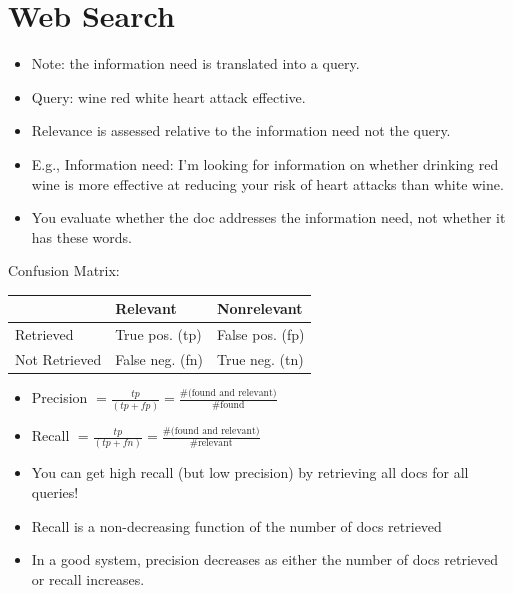 
\section{Web Search}

\begin{breakbox}
\begin{itemize}
	\item Note: the information need is translated into a query.
	\item Query: wine red white heart attack effective.
	\item Relevance is assessed relative to the information need not the query.
	\item E.g., Information need: I'm looking for information on whether drinking red wine is more effective at reducing your risk of heart attacks than white wine.
	\item You evaluate whether the doc addresses the information need, not whether it has these words.
\end{itemize}
\end{breakbox}

\begin{breakbox}
\newline Confusion Matrix:
\begin{center}
\begin{tabular}{| l | l | l |}
\hline
 & Relevant & Nonrelevant \\ \hline
Retrieved	& True pos. (tp) & False pos. (fp) \\ \hline
Not Retrieved & False neg. (fn) & True neg. (tn) \\
\hline
\end{tabular}
\end{center}
\begin{itemize}
	\item Precision $= \frac{tp}{(tp + fp)} = \frac{\text{\# (found and relevant)}}{\text{\# found}}$
	\item Recall $= \frac{tp}{(tp + fn)} = \frac{\text{\# (found and relevant)}}{\text{\# relevant}}$
\end{itemize}
\end{breakbox}

\begin{breakbox}
\begin{itemize}
	\item You can get high recall (but low precision) by retrieving all docs for all queries!
	\item Recall is a non-decreasing function of the number of docs retrieved
	\item In a good system, precision decreases as either the number of docs retrieved or recall increases.
\end{itemize}
\end{breakbox}

